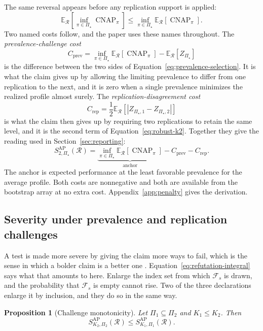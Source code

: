\documentclass[11pt]{article}
\newcommand{\CNAP}{\operatorname{CNAP}}
\newcommand{\Regime}{\mathcal{R}}
\newcommand{\PSet}{\Pi_\star}
\newcommand{\E}{\mathbb{E}}
\newcommand{\RefSet}{\mathcal{F}}
\newtheorem{proposition}{Proposition}
\theoremstyle{remark}
\begin{document}
The same reversal appears before any replication support is applied:
\begin{equation}
\E_{\Regime}
\left[
\inf_{\pi\in\PSet}\CNAP_\pi
\right]
\leq
\inf_{\pi\in\PSet}
\E_{\Regime}
\left[
\CNAP_\pi
\right].
\label{eq:prevalence-selection}
\end{equation}
Two named costs follow, and the paper uses these names throughout. The \emph{prevalence-challenge cost}
\[
C_{\mathrm{prev}}
=
\inf_{\pi\in\PSet}\E_{\Regime}[\CNAP_\pi]
-
\E_{\Regime}[Z_{\PSet}]
\]
is the difference between the two sides of Equation~\eqref{eq:prevalence-selection}. It is what the claim gives up by allowing the limiting prevalence to differ from one replication to the next, and it is zero when a single prevalence minimizes the realized profile almost surely. The \emph{replication-disagreement cost}
\[
C_{\mathrm{rep}}
=
\frac12
\E_{\Regime}
\left[
|Z_{\PSet,1}-Z_{\PSet,2}|
\right]
\]
is what the claim then gives up by requiring two replications to retain the same level, and it is the second term of Equation~\eqref{eq:robust-k2}. Together they give the reading used in Section~\ref{sec:reporting}:
\begin{equation}
S_{2,\PSet}^{\mathrm{AP}}(\Regime)
=
\underbrace{\inf_{\pi\in\PSet}\E_{\Regime}[\CNAP_\pi]}_{\text{anchor}}
-
C_{\mathrm{prev}}
-
C_{\mathrm{rep}}.
\label{eq:two-costs}
\end{equation}
The anchor is expected performance at the least favorable prevalence for the average profile. Both costs are nonnegative and both are available from the bootstrap array at no extra cost. Appendix~\ref{app:penalty} gives the derivation.

\subsection{Severity under prevalence and replication challenges}
\label{sec:severity}

A test is made more severe by giving the claim more ways to fail, which is the sense in which a bolder claim is a better one \cite{popper1963conjectures}. Equation~\eqref{eq:refutation-integral} says what that amounts to here. Enlarge the index set from which $\RefSet_s$ is drawn, and the probability that $\RefSet_s$ is empty cannot rise. Two of the three declarations enlarge it by inclusion, and they do so in the same way.

\begin{proposition}[Challenge monotonicity]
\label{prop:challenge-monotonicity}
Let $\Pi_1\subseteq\Pi_2$ and $K_1\leq K_2$. Then
\begin{equation}
S_{K_2,\Pi_2}^{\mathrm{AP}}(\Regime)
\leq
S_{K_1,\Pi_1}^{\mathrm{AP}}(\Regime).
\label{eq:challenge-monotonicity}
\end{equation}
\end{proposition}
\end{document}
